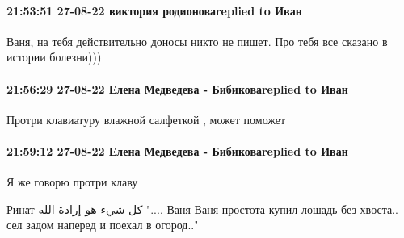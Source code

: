  
 
 
 
 

\paragraph{21:53:51 27-08-22 виктория родионоваreplied to Иван}

Ваня, на тебя действительно доносы никто не пишет. Про тебя все сказано в
истории болезни)))

\paragraph{21:56:29 27-08-22 Елена Медведева - Бибиковаreplied to Иван}
Протри клавиатуру влажной салфеткой , может поможет

\paragraph{21:59:12 27-08-22 Елена Медведева - Бибиковаreplied to Иван}
Я же говорю протри клаву

Ринат كل شيء هو إرادة الله
".... Ваня Ваня простота купил лошадь без хвоста.. сел задом наперед и поехал в огород.."
